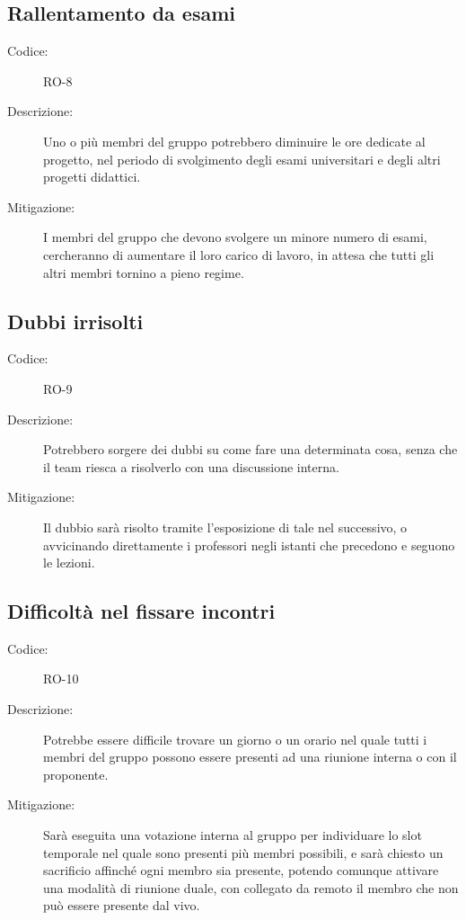 \subsection*{Rallentamento da esami}
\begin{description}
    \item[Codice:] RO-8
    \item[Descrizione:] Uno o più membri del gruppo potrebbero diminuire le ore dedicate al progetto, nel periodo di svolgimento degli esami universitari e degli altri progetti didattici.
    \item[Mitigazione:] I membri del gruppo che devono svolgere un minore numero di esami, cercheranno di aumentare il loro carico di lavoro, in attesa che tutti gli altri membri tornino a pieno regime.
\end{description}

\subsection*{Dubbi irrisolti}
\begin{description}
    \item[Codice:] RO-9
    \item[Descrizione:] Potrebbero sorgere dei dubbi su come fare una determinata cosa, senza che il team riesca a risolverlo con una discussione interna.
    \item[Mitigazione:] Il dubbio sarà risolto tramite l'esposizione di tale nel  successivo, o avvicinando direttamente i professori negli istanti che precedono e seguono le lezioni.
\end{description}

\subsection*{Difficoltà nel fissare incontri}
\begin{description}
    \item[Codice:] RO-10
    \item[Descrizione:] Potrebbe essere difficile trovare un giorno o un orario nel quale tutti i membri del gruppo possono essere presenti ad una riunione interna o con il proponente.
    \item[Mitigazione:] Sarà eseguita una votazione interna al gruppo per individuare lo slot temporale nel quale sono presenti più membri possibili, e sarà chiesto un sacrificio affinché ogni membro sia presente, potendo comunque attivare una modalità di riunione duale, con collegato da remoto il membro che non può essere presente dal vivo.
\end{description}

